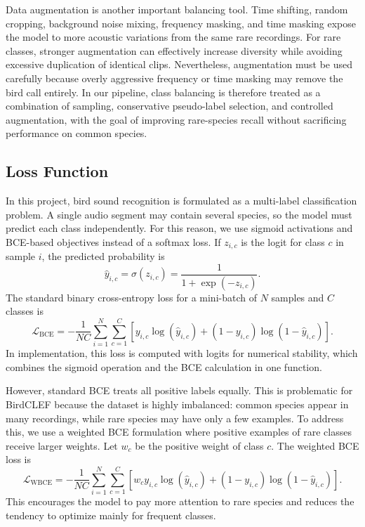 \documentclass[a4paper,12pt]{article}
\begin{document}
Data augmentation is another important balancing tool. Time shifting, random cropping, background noise mixing, frequency masking, and time masking expose the model to more acoustic variations from the same rare recordings. For rare classes, stronger augmentation can effectively increase diversity while avoiding excessive duplication of identical clips. Nevertheless, augmentation must be used carefully because overly aggressive frequency or time masking may remove the bird call entirely. In our pipeline, class balancing is therefore treated as a combination of sampling, conservative pseudo-label selection, and controlled augmentation, with the goal of improving rare-species recall without sacrificing performance on common species.


\subsection{Loss Function}
In this project, bird sound recognition is formulated as a multi-label classification problem. A single audio segment may contain several species, so the model must predict each class independently. For this reason, we use sigmoid activations and BCE-based objectives instead of a softmax loss. If $z_{i,c}$ is the logit for class $c$ in sample $i$, the predicted probability is
\[
\hat{y}_{i,c}=\sigma(z_{i,c})=\frac{1}{1+\exp(-z_{i,c})}.
\]
The standard binary cross-entropy loss for a mini-batch of $N$ samples and $C$ classes is
\[
\mathcal{L}_{\mathrm{BCE}}
= -\frac{1}{NC}\sum_{i=1}^{N}\sum_{c=1}^{C}
\left[y_{i,c}\log(\hat{y}_{i,c})+(1-y_{i,c})\log(1-\hat{y}_{i,c})\right].
\]
In implementation, this loss is computed with logits for numerical stability, which combines the sigmoid operation and the BCE calculation in one function.

However, standard BCE treats all positive labels equally. This is problematic for BirdCLEF because the dataset is highly imbalanced: common species appear in many recordings, while rare species may have only a few examples. To address this, we use a weighted BCE formulation where positive examples of rare classes receive larger weights. Let $w_c$ be the positive weight of class $c$. The weighted BCE loss is
\[
\mathcal{L}_{\mathrm{WBCE}}
= -\frac{1}{NC}\sum_{i=1}^{N}\sum_{c=1}^{C}
\left[w_c y_{i,c}\log(\hat{y}_{i,c})+(1-y_{i,c})\log(1-\hat{y}_{i,c})\right].
\]
This encourages the model to pay more attention to rare species and reduces the tendency to optimize mainly for frequent classes.
\end{document}
